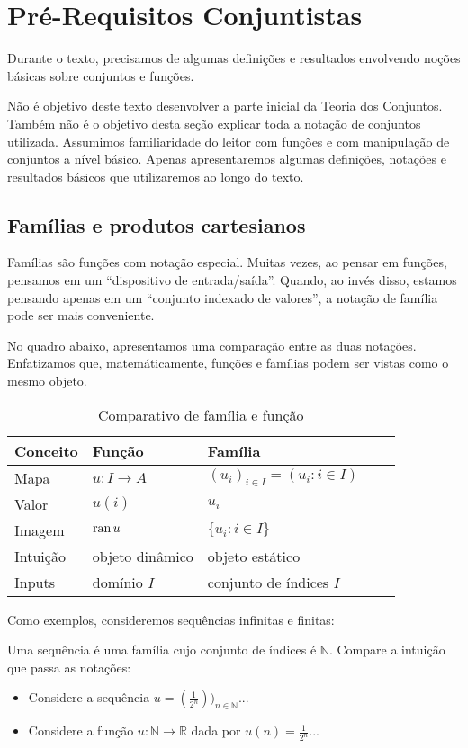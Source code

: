 
\chapter{Pré-Requisitos Conjuntistas}
Durante o texto, precisamos de algumas definições e resultados envolvendo noções básicas sobre conjuntos e funções.

Não é objetivo deste texto desenvolver a parte inicial da Teoria dos Conjuntos.
Também não é o objetivo desta seção explicar toda a notação de conjuntos utilizada.
Assumimos familiaridade do leitor com funções e com manipulação de conjuntos a nível básico. Apenas apresentaremos algumas definições, notações e resultados básicos que utilizaremos ao longo do texto.

\section{Famílias e produtos cartesianos}

Famílias são funções com notação especial.
Muitas vezes, ao pensar em funções, pensamos em um ``dispositivo de entrada/saída''.
Quando, ao invés disso, estamos pensando apenas em um  ``conjunto indexado de valores'', a notação de família pode ser mais conveniente.

No quadro abaixo, apresentamos uma comparação entre as duas notações.
Enfatizamos que, matemáticamente, funções e famílias podem ser vistas como o mesmo objeto.
\begin{table}[h]
    \centering
    \begin{tabular}{lllll}
        \hline
        \textbf{Conceito} & \textbf{Função} & \textbf{Família} \\ \hline
        Mapa & $u:I\rightarrow A$ & $(u_i)_{i \in I}=(u_i: i \in I)$ \\
        Valor & $u(i)$ & $u_i$ \\
        Imagem & $\operatorname{ran} u$ & $\{u_i: i \in I\}$\\
        Intuição & objeto dinâmico & objeto estático \\
        Inputs & domínio $I$ & conjunto de índices $I$ \\
        \hline
    \end{tabular}
    \caption{Comparativo de família e função}
\end{table}

Como exemplos, consideremos sequências infinitas e finitas:

\begin{exemplo}[Sequências]
    Uma sequência é uma família cujo conjunto de índices é $\mathbb N$.
    Compare a intuição que passa as notações:
    \begin{itemize}
    \item Considere a sequência $u=(\frac{1}{2^n}))_{n \in \mathbb N}$...
    \item Considere a função $u:\mathbb N\rightarrow \mathbb R$ dada por $u(n)=\frac{1}{2^n}$...
    \end{itemize}
    

\end{exemplo}

